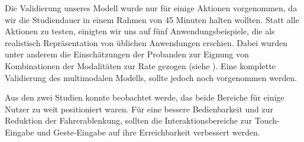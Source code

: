 Die Validierung unseres Modell wurde nur für einige Aktionen vorgenommen, da wir die Studiendauer in einem Rahmen von 45 Minuten halten wollten. 
Statt alle Aktionen zu testen, einigten wir uns auf fünf Anwendungsbeispiele, die als realistisch Repräsentation von üblichen Anwendungen erschien.
Dabei wurden unter anderem die Einschätzungen der Probanden zur Eignung von Kombinationen der Modalitäten zur Rate gezogen (siehe ).
Eine komplette Validierung des multimodalen Modells, sollte jedoch noch vorgenommen werden. 

Aus den zwei Studien konnte beobachtet werde, das beide Bereiche für einige Nutzer zu weit positioniert waren.   
Für eine bessere Bedienbarkeit und zur Reduktion der Fahrerablenkung, sollten die Interaktionsbereiche zur Touch-Eingabe und Geste-Eingabe auf ihre Erreichbarkeit verbessert werden. 